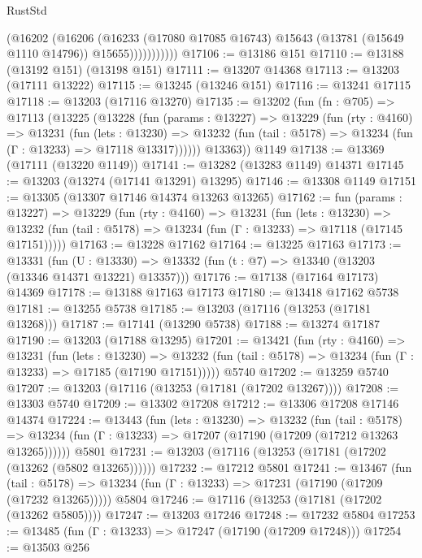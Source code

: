 \begin{lexlean}{RustStd}
\begin{coremodule}
                    (@16202
                      (@16206
                        (@16233
                          (@17080 @17085 @16743)
                          @15643
                          (@13781 (@15649 @1110 @14796))
                          @15655)))))))))))
@17106 := @13186 @151
@17110 := @13188 (@13192 @151) (@13198 @151)
@17111 := @13207 @14368
@17113 := @13203 (@17111 @13222)
@17115 := @13245 (@13246 @151)
@17116 := @13241 @17115
@17118 := @13203 (@17116 @13270)
@17135 := @13202
    (fun (fn : @705) =>
    @17113
      (@13225
        (@13228
          (fun (params : @13227) =>
          @13229
            (fun (rty : @4160) =>
            @13231
              (fun (lets : @13230) =>
              @13232 (fun (tail : @5178) => @13234 (fun (Γ : @13233) => @17118 @13317))))))
        @13363))
    @1149
@17138 := @13369 (@17111 (@13220 @1149))
@17141 := @13282 (@13283 @1149) @14371
@17145 := @13203 (@13274 (@17141 @13291) @13295)
@17146 := @13308 @1149
@17151 := @13305 (@13307 @17146 @14374 @13263 @13265)
@17162 := fun (params : @13227) =>
  @13229
    (fun (rty : @4160) =>
    @13231
      (fun (lets : @13230) =>
      @13232 (fun (tail : @5178) => @13234 (fun (Γ : @13233) => @17118 (@17145 @17151)))))
@17163 := @13228 @17162
@17164 := @13225 @17163
@17173 := @13331
    (fun (U : @13330) => @13332 (fun (t : @7) => @13340 (@13203 (@13346 @14371 @13221) @13357)))
@17176 := @17138 (@17164 @17173) @14369
@17178 := @13188 @17163 @17173
@17180 := @13418 @17162 @5738
@17181 := @13255 @5738
@17185 := @13203 (@17116 (@13253 (@17181 @13268)))
@17187 := @17141 (@13290 @5738)
@17188 := @13274 @17187
@17190 := @13203 (@17188 @13295)
@17201 := @13421
    (fun (rty : @4160) =>
    @13231
      (fun (lets : @13230) =>
      @13232 (fun (tail : @5178) => @13234 (fun (Γ : @13233) => @17185 (@17190 @17151)))))
    @5740
@17202 := @13259 @5740
@17207 := @13203 (@17116 (@13253 (@17181 (@17202 @13267))))
@17208 := @13303 @5740
@17209 := @13302 @17208
@17212 := @13306 @17208 @17146 @14374
@17224 := @13443
    (fun (lets : @13230) =>
    @13232
      (fun (tail : @5178) =>
      @13234 (fun (Γ : @13233) => @17207 (@17190 (@17209 (@17212 @13263 @13265))))))
    @5801
@17231 := @13203 (@17116 (@13253 (@17181 (@17202 (@13262 (@5802 @13265))))))
@17232 := @17212 @5801
@17241 := @13467
    (fun (tail : @5178) => @13234 (fun (Γ : @13233) => @17231 (@17190 (@17209 (@17232 @13265)))))
    @5804
@17246 := @17116 (@13253 (@17181 (@17202 (@13262 @5805))))
@17247 := @13203 @17246
@17248 := @17232 @5804
@17253 := @13485 (fun (Γ : @13233) => @17247 (@17190 (@17209 @17248)))
@17254 := @13503 @256

\end{coremodule}
\end{lexlean}
